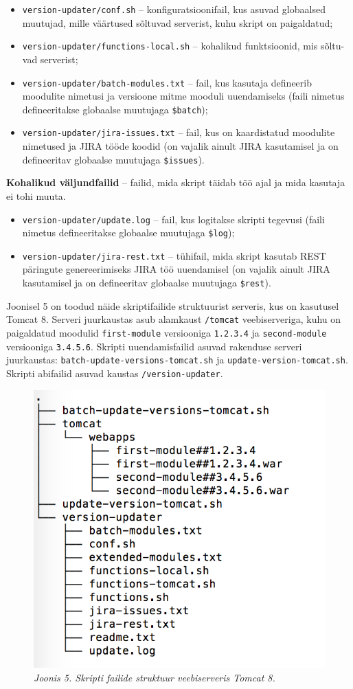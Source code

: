 \documentclass[12pt]{article}
\newcommand{\code}[1]{\texttt{#1}}
\begin{document}
  \begin{itemize}
    \item \code{version-updater/conf.sh} \--- konfiguratsioonifail, kus asuvad globaalsed muutujad, mille väärtused sõltuvad serverist, kuhu skript on paigaldatud;
    \item \code{version-updater/functions-local.sh} \--- kohalikud funktsioonid, mis sõltu\--vad serverist;
    \item \code{version-updater/batch-modules.txt} \--- fail, kus kasutaja defineerib moodulite nimetusi ja versioone mitme mooduli uuendamiseks (faili nimetus defineeritakse globaalse muutujaga \code{\$batch});
    \item \code{version-updater/jira-issues.txt} \--- fail, kus on kaardistatud moodulite nimetused ja JIRA tööde koodid (on vajalik ainult JIRA kasutamisel ja on defineeritav globaalse muutujaga \code{\$issues}).
  \end{itemize}
  
  \textbf{Kohalikud väljundfailid} \--- failid, mida skript täidab töö ajal ja mida kasutaja ei tohi muuta.
  
  \begin{itemize}
    \item \code{version-updater/update.log} \--- fail, kus logitakse skripti tegevusi (faili nimetus defineeritakse globaalse muutujaga \code{\$log});
    \item \code{version-updater/jira-rest.txt} \--- tühifail, mida skript kasutab REST \cite{rest} päringute genereerimiseks JIRA töö uuendamisel \cite{jira} (on vajalik ainult JIRA kasutamisel ja on defineeritav globaalse muutujaga \code{\$rest}).
  \end{itemize}
  
  Joonisel 5 on toodud näide skriptifailide struktuurist serveris, kus on kasutusel Tomcat 8. Serveri juurkaustas asub alamkaust \code{/tomcat} veebiserveriga, kuhu on paigaldatud moodulid \code{first-module} versiooniga \code{1.2.3.4} ja \code{second-module} versiooniga \code{3.4.5.6}. Skripti uuendamisfailid asuvad rakenduse serveri juurkaustas: \code{batch-update-versions-tomcat.sh} ja \code{update-version-tomcat.sh}. Skripti abifailid asuvad kaustas \code{/version-updater}.
  
  \begin{figure}[H] 
    \begin{center}
      \includegraphics[width=.4\textwidth]{screenshots/file-structure-on-tomcat.png}
      \caption*{\textit{Joonis 5. Skripti failide struktuur veebiserveris Tomcat 8.}}
      \end{center}
   \end{figure}
   
\end{document}
